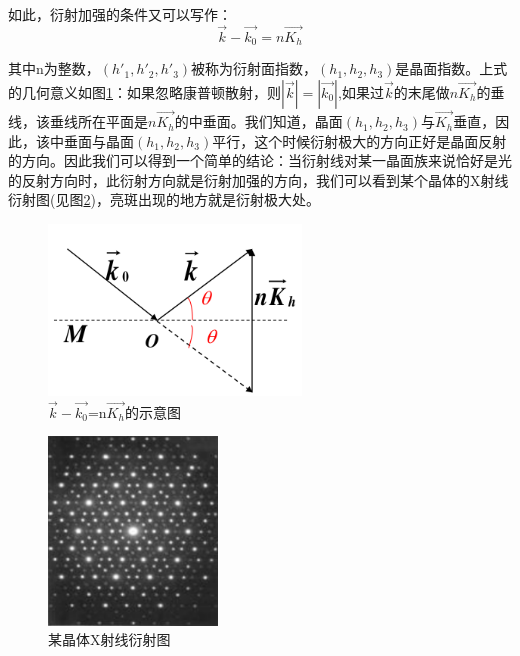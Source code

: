 \documentclass{ctexart}
\begin{document}
        如此，衍射加强的条件又可以写作：
        \begin{equation}
            \vec{k}-\vec{k_0}=n\vec{K_h}
        \end{equation}
        
        其中n为整数，$(h'_1,h'_2,h'_3)$被称为衍射面指数，$(h_1,h_2,h_3)$是晶面指数。上式的几何意义如图\ref{fig:Braggequation}：如果忽略康普顿散射，则$|\vec{k}|=|\vec{k_0}|$,如果过$\vec{k}$的末尾做$n\vec{K_h}$的垂线，该垂线所在平面是$n\vec{K_h}$的中垂面。我们知道，晶面$(h_1,h_2,h_3)$与$\vec{K_h}$垂直，因此，该中垂面与晶面$(h_1,h_2,h_3)$平行，这个时候衍射极大的方向正好是晶面反射的方向。因此我们可以得到一个简单的结论：当衍射线对某一晶面族来说恰好是光的反射方向时，此衍射方向就是衍射加强的方向，我们可以看到某个晶体的X射线衍射图(见图\ref{fig:exampleXraydiffraction})，亮斑出现的地方就是衍射极大处。
        
        \begin{figure}[H]
            \centering
            \includegraphics[width=0.6\textwidth]{figure/布拉格方程.png}
            \caption{$\vec{k}-\vec{k_0}$=n$\vec{K_h}$的示意图}
            \label{fig:Braggequation}
        \end{figure}
        
        \begin{figure}[H]
            \centering
            \includegraphics[width=0.4\textwidth]{figure/某晶体X射线衍射图.png}
            \caption{某晶体X射线衍射图}
            \label{fig:exampleXraydiffraction}
        \end{figure}
        
\end{document}
